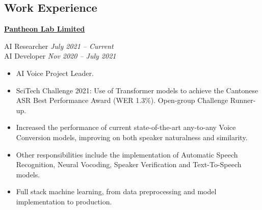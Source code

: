 \documentclass[10pt]{article} %
\begin{document}
\begin{changemargin}{0pt}{0.5pt} %

\begin{minipage}[t]{0.5\textwidth} %
\vspace{0pt} %


\section{Work Experience}

\begin{changemargin}{1pt}{1pt}

\underline{\textbf{Pantheon Lab Limited}}\\
\par
\vspace{-10pt}
AI Researcher \hfill \textit{July 2021 -- Current}\\

\vspace{-15pt}
AI Developer \hfill \textit{Nov 2020 -- July 2021}\\
\vspace{-15pt}

\begin{itemize} \itemsep-2pt %
	\item AI Voice Project Leader. 
	\item SciTech Challenge 2021: Use of Transformer models to achieve the Cantonese ASR Best Performance Award (WER 1.3\%). Open-group Challenge Runner-up.
	\item Increased the performance of current state-of-the-art any-to-any Voice Conversion models, improving on both speaker naturalness and similarity.
	\item Other  responsibilities include the implementation of Automatic Speech Recognition, Neural Vocoding, Speaker Verification and Text-To-Speech models.
	\item Full stack machine learning, from data preprocessing and model implementation to production.
\end{itemize}
	

\end{changemargin}
\end{minipage}
\end{changemargin}
\end{document}
